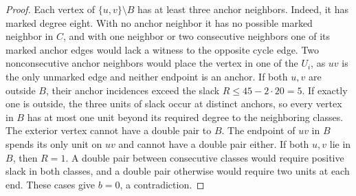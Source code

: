 \documentclass[preprint,11pt,numbers]{elsarticle-arxiv}
\numberwithin{equation}{section}
\theoremstyle{definition}
\begin{document}
\begin{proof}
Each vertex of $\{u,v\}\setminus B$ has at least three
anchor neighbors. Indeed, it has marked degree eight.
With no anchor neighbor it has no possible marked neighbor
in $C$, and with one neighbor or two consecutive neighbors
one of its marked anchor edges would lack a witness to the
opposite cycle edge. Two nonconsecutive anchor neighbors would
place the vertex in one of the $U_i$, as $uv$ is the only unmarked
edge and neither endpoint is an anchor. If both $u,v$ are outside
$B$, their anchor incidences exceed the slack $R\le45-2\cdot20=5$. If
exactly one is outside, the three units of slack occur at
distinct anchors, so every vertex in $B$ has at most one
unit beyond its required degree to the neighboring classes.
The exterior vertex cannot have a double pair to $B$.
The endpoint of $uv$ in $B$ spends its only unit on $uv$
and cannot have a double pair either. If both $u,v$ lie in
$B$, then $R=1$. A double pair between consecutive classes
would require positive slack in both classes, and a double
pair otherwise would require two units at each end. These
cases give $b=0$, a contradiction.


\end{proof}
\end{document}
